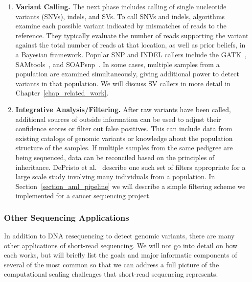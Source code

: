 \begin{enumerate}
\item \textbf{Variant Calling.} The next phase includes calling of single nucleotide variants (SNVs), indels, and SVs. To call SNVs and indels, algorithms examine each possible variant indicated by mismatches of reads to the reference. They typically evaluate the number of reads supporting the variant against the total number of reads at that location, as well as prior beliefs, in a Bayesian framework. Popular SNP and INDEL callers include the GATK~\cite{McKenna:2010p1051}, SAMtools~\cite{Li:2009vz}, and SOAPsnp~\cite{Li:2009p1236}. In some cases, multiple samples from a population are examined simultaneously, giving additional power to detect variants in that population. We will discuss SV callers in more detail in Chapter~\ref{chap_related_work}.

\item \textbf{Integrative Analysis/Filtering.} After raw variants have been called, additional sources of outside information can be used to adjust their confidence scores or filter out false positives. This can include data from existing catalogs of genomic variants or knowledge about the population structure of the samples. If multiple samples from the same pedigree are being sequenced, data can be reconciled based on the principles of inheritance. DePristo et al.~\cite{DePristo:2011fo} describe one such set of filters appropriate for a large scale study involving many individuals from a population. In Section~\ref{section_aml_pipeline} we will describe a simple filtering scheme we implemented for a cancer sequencing project.

\end{enumerate}

\subsubsection{Other Sequencing Applications}

In addition to DNA resequencing to detect genomic variants, there are many other applications of short-read sequencing. We will not go into detail on how each works, but will briefly list the goals and major informatic components of several of the most common so that we can address a full picture of the computational scaling challenges that short-read sequencing represents. 


